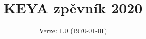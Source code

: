 \documentclass[twoside,12pt,a5paper]{article}
\title{KEYA zpěvník 2020}
\date{Verze: 1.0 (\today)}
\begin{document}
\maketitle
\clearpage
\begin{multicols}{2}
\begin{footnotesize}
\tableofcontents{}
\end{footnotesize}
\end{multicols}
\clearpage

\end{document}
